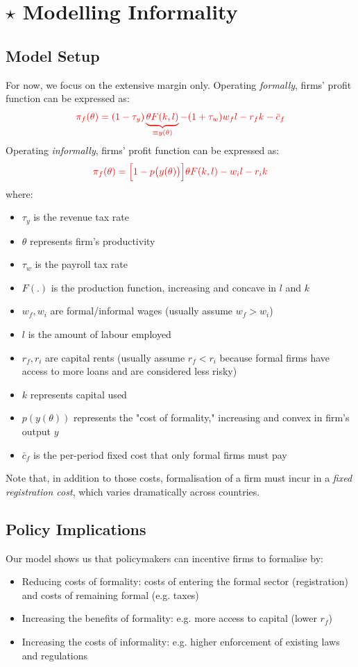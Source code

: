 \section{$\star$ Modelling Informality}
    \subsection{Model Setup}
        For now, we focus on the extensive margin only.
        Operating \emph{formally}, firms' profit function can be expressed as:
        $$\color{red} \pi_f(\theta) = (1-\tau_y)\underbrace{\theta F(k,l)}_{\equiv y(\theta)} - (1+\tau_w)w_fl -r_f k - \bar{c}_f$$
        Operating \emph{informally}, firms' profit function can be expressed as:
        $$\color{red} \pi_f(\theta) = \Big[1-p\big(y(\theta)\big)\Big]\theta F(k,l) - w_il -r_ik$$
        where:
        \begin{itemize}
            \item $\tau_y$ is the revenue tax rate
            \item $\theta$ represents firm's productivity
            \item $\tau_w$ is the payroll tax rate
            \item $F(.)$ is the production function, increasing and concave in $l$ and $k$
            \item $w_f, w_i$ are formal/informal wages (usually assume $w_f>w_i$)
            \item $l$ is the amount of labour employed
            \item $r_f, r_i$ are capital rents (usually assume $r_f<r_i$ because formal firms have access to more loans and are considered less risky)
            \item $k$ represents capital used
            \item $p(y(\theta))$ represents the "cost of formality," increasing and convex in firm's output $y$
            \item $\bar{c}_f$ is the per-period fixed cost that only formal firms must pay
        \end{itemize}
        Note that, in addition to those costs, formalisation of a firm must incur in a \emph{fixed registration cost}, which varies dramatically across countries.
    
    \subsection{Policy Implications}
        Our model shows us that policymakers can incentive firms to formalise by:
        \begin{itemize}
            \item Reducing costs of formality: costs of entering the formal sector (registration) and costs of remaining formal (e.g. taxes)
            \item Increasing the benefits of formality: e.g. more access to capital (lower $r_f$)
            \item Increasing the costs of informality: e.g. higher enforcement of existing laws and regulations
        \end{itemize}
        
